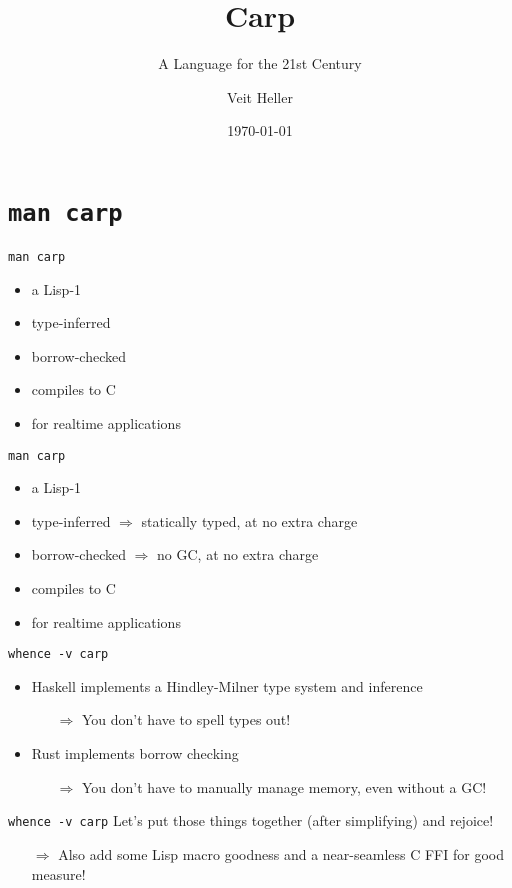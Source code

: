 \documentclass[aspectratio=169]{beamer}
\title{Carp}
\subtitle{A Language for the 21st Century}
\date{\today}
\author{Veit Heller}
\institute{Port Zero}
\begin{document}
  \maketitle
  \section{\texttt{man carp}}
  \begin{frame}{\texttt{man carp}}
    \begin{itemize}
      \item a Lisp-1
      \item type-inferred
      \item borrow-checked
      \item compiles to C
      \item for realtime applications
    \end{itemize}
  \end{frame}
  \begin{frame}{\texttt{man carp}}
    \begin{itemize}
      \item a Lisp-1
      \item type-inferred $\Rightarrow$ statically typed, at no extra charge
      \item borrow-checked $\Rightarrow$ no GC, at no extra charge
      \item compiles to C
      \item for realtime applications
    \end{itemize}
  \end{frame}
  \begin{frame}{\texttt{whence -v carp}}
    \begin{itemize}
      \item Haskell implements a Hindley-Milner type system and inference
      \begin{itemize}
        \item[$\Rightarrow$] You don’t have to spell types out!
      \end{itemize}
      \item Rust implements borrow checking
      \begin{itemize}
        \item[$\Rightarrow$] You don’t have to manually manage memory, even without a GC!
      \end{itemize}
    \end{itemize}
  \end{frame}
  \begin{frame}{\texttt{whence -v carp}}
    Let’s put those things together (after simplifying) and rejoice!
    \begin{itemize}
      \item[$\Rightarrow$] Also add some Lisp macro goodness and a near-seamless C FFI for good measure!
    \end{itemize}
  \end{frame}
\end{document}

